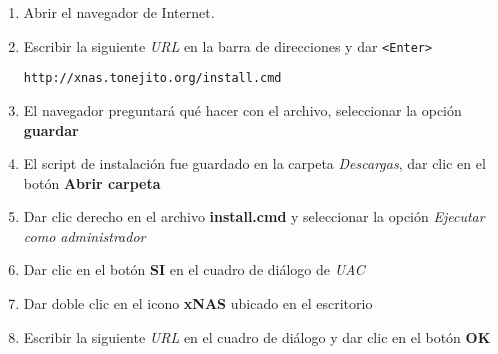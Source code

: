 {
\linespread{0.1}
\begin{enumerate}

  \item Abrir el navegador de Internet.


  \item Escribir la siguiente \textit{URL} en la barra de direcciones y dar \texttt{<Enter>}

    \texttt{http://xnas.tonejito.org/install.cmd}


  \item El navegador preguntar\'{a} qu\'{e} hacer con el archivo, seleccionar la opci\'{o}n \textbf{guardar}


  \item El script de instalaci\'{o}n fue guardado en la carpeta \textsl{Descargas}, dar clic en el bot\'{o}n \textbf{Abrir carpeta}


%

  \item Dar clic derecho en el archivo \textbf{install.cmd} y seleccionar la opci\'{o}n \textsl{Ejecutar como administrador}


  \item Dar clic en el bot\'{o}n \textbf{SI} en el cuadro de di\'{a}logo de \textit{UAC}


%

  \item Dar doble clic en el icono \textbf{xNAS} ubicado en el escritorio


  \item Escribir la siguiente \textit{URL} en el cuadro de di\'{a}logo y dar clic en el bot\'{o}n \textbf{OK}


\end{enumerate}}
